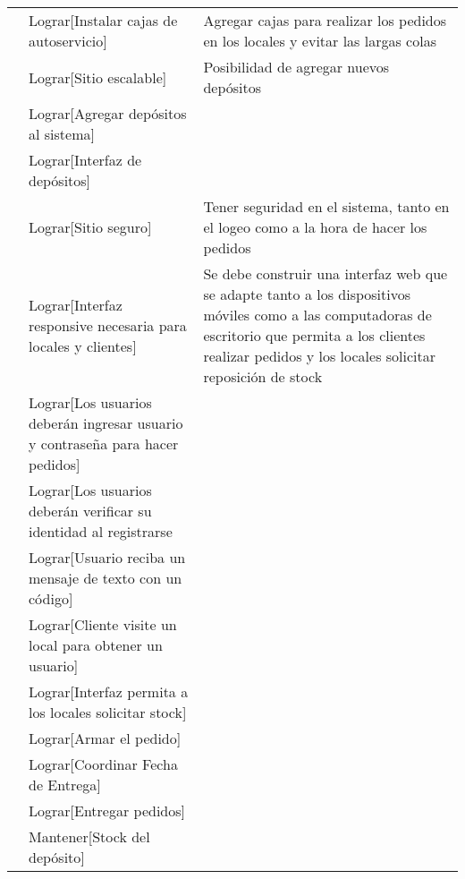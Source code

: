 \documentclass[a4paper]{article}
\begin{document}
\begin{table}[h]
\begin{tabular}{p{1.5cm} p{7cm} p{8cm}}
\rule{0pt}{1.2em}  & Lograr[Instalar cajas de autoservicio] & Agregar cajas para realizar los pedidos en los locales y evitar las largas colas \\[0.2em]

\rule{0pt}{1.2em}  & Lograr[Sitio escalable] & Posibilidad de agregar nuevos depósitos \\[0.2em]

\rule{0pt}{1.2em}  & Lograr[Agregar depósitos al sistema] & \\[0.2em]

\rule{0pt}{1.2em}  & Lograr[Interfaz de depósitos] &  \\[0.2em]

\rule{0pt}{1.2em}  & Lograr[Sitio seguro] & Tener seguridad en el sistema, tanto en el logeo como a la hora de hacer los pedidos \\[0.2em]

\rule{0pt}{1.2em}  &  Lograr[Interfaz responsive necesaria para locales y clientes]& Se debe construir una interfaz web que se adapte tanto a los dispositivos móviles como a las computadoras de escritorio que permita a los clientes realizar pedidos y los locales solicitar reposición de stock \\[0.2em]

\rule{0pt}{1.2em}  & Lograr[Los usuarios deberán ingresar usuario y contraseña para hacer pedidos] &  \\[0.2em]

\rule{0pt}{1.2em}  &  Lograr[Los usuarios deberán verificar su identidad al registrarse&  \\[0.2em]

\rule{0pt}{1.2em}  &  Lograr[Usuario reciba un mensaje de texto con un código] &  \\[0.2em]

\rule{0pt}{1.2em}  & Lograr[Cliente visite un local para obtener un usuario] &  \\[0.2em]

\rule{0pt}{1.2em} & Lograr[Interfaz permita a los locales solicitar stock] & \\[0.2em]

\rule{0pt}{1.2em} & Lograr[Armar el pedido] & \\[0.2em]

\rule{0pt}{1.2em} & Lograr[Coordinar Fecha de Entrega]& \\[0.2em]

\rule{0pt}{1.2em} & Lograr[Entregar pedidos]& \\[0.2em]

\rule{0pt}{1.2em} & Mantener[Stock del depósito] & \\[0.2em]

\end{tabular}
\end{table}
\end{document}
